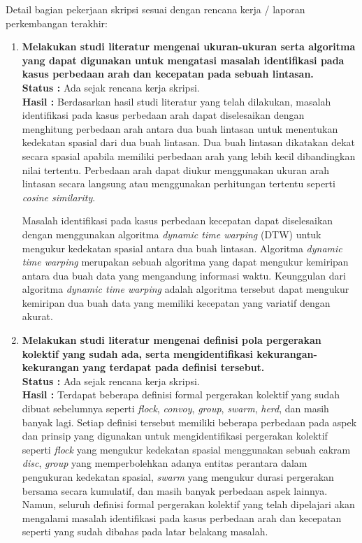 \documentclass[a4paper,twoside]{article}
\begin{document}
Detail bagian pekerjaan skripsi sesuai dengan rencana kerja / laporan perkembangan terakhir:
	\begin{enumerate}
		\item \textbf{Melakukan studi literatur mengenai ukuran-ukuran serta algoritma yang dapat digunakan untuk mengatasi masalah identifikasi pada kasus perbedaan arah dan kecepatan pada sebuah lintasan.} \\
		{\bf Status :} Ada sejak rencana kerja skripsi.\\
		{\bf Hasil :} Berdasarkan hasil studi literatur yang telah dilakukan, masalah identifikasi pada kasus perbedaan arah dapat diselesaikan dengan menghitung perbedaan arah antara dua buah lintasan untuk menentukan kedekatan spasial dari dua buah lintasan. Dua buah lintasan dikatakan dekat secara spasial apabila memiliki perbedaan arah yang lebih kecil dibandingkan nilai tertentu. Perbedaan arah dapat diukur menggunakan ukuran arah lintasan secara langsung atau menggunakan perhitungan tertentu seperti \textit{cosine similarity}.
		
		Masalah identifikasi pada kasus perbedaan kecepatan dapat diselesaikan dengan menggunakan algoritma \textit{dynamic time warping} (DTW) untuk mengukur kedekatan spasial antara dua buah lintasan. Algoritma \textit{dynamic time warping} merupakan sebuah algoritma yang dapat mengukur kemiripan antara dua buah data yang mengandung informasi waktu. Keunggulan dari algoritma \textit{dynamic time warping} adalah algoritma tersebut dapat mengukur kemiripan dua buah data yang memiliki kecepatan yang variatif dengan akurat. \\
		
		\item \textbf{Melakukan studi literatur mengenai definisi pola pergerakan kolektif yang sudah ada, serta mengidentifikasi kekurangan-kekurangan yang terdapat pada definisi tersebut.}\\
		{\bf Status :} Ada sejak rencana kerja skripsi.\\
		{\bf Hasil :} Terdapat beberapa definisi formal pergerakan kolektif yang sudah dibuat sebelumnya seperti \textit{flock}, \textit{convoy}, \textit{group}, \textit{swarm}, \textit{herd}, dan masih banyak lagi. Setiap definisi tersebut memiliki beberapa perbedaan pada aspek dan prinsip yang digunakan untuk mengidentifikasi pergerakan kolektif seperti \textit{flock} yang mengukur kedekatan spasial menggunakan sebuah cakram \textit{disc}, \textit{group} yang memperbolehkan adanya entitas perantara dalam pengukuran kedekatan spasial, \textit{swarm} yang mengukur durasi pergerakan bersama secara kumulatif, dan masih banyak perbedaan aspek lainnya. Namun, seluruh definisi formal pergerakan kolektif yang telah dipelajari akan mengalami masalah identifikasi pada kasus perbedaan arah dan kecepatan seperti yang sudah dibahas pada latar belakang masalah. \\


\end{enumerate}
\end{document}

